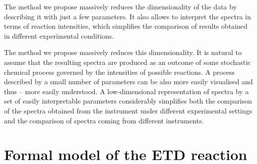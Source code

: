 \documentclass{llncs}
\begin{document}
        The method we propose massively reduces the dimensionality of the data by describing it with just a few parameters. It also allows to interpret the spectra in terms of reaction intensities, which simplifies the comparison of results obtained in different experimental conditions.

        The method we propose massively reduces this dimensionality. It is natural to assume that the resulting spectra are produced as an outcome of some stochastic chemical process governed by the intensities of possible reactions. A process described by a small number of parameters can be also more easily visualised and thus -- more easily understood. A low-dimensional representation of spectra by a set of easily interpretable parameters considerably simplifies both the comparison of the spectra obtained from the instrument under different experimental settings and the comparison of spectra coming from different instruments.



\section{Formal model of the ETD reaction}
\end{document}
